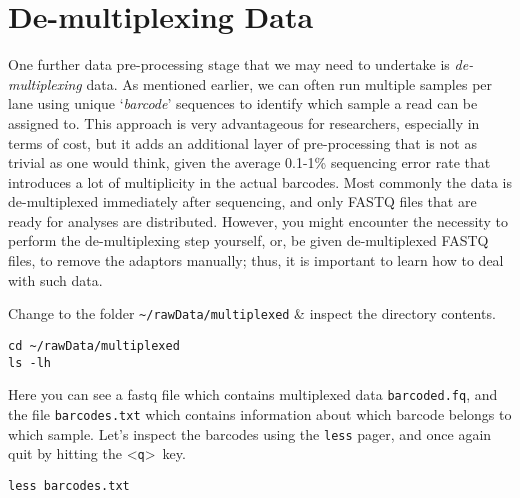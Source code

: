 



\section{De-multiplexing Data}

\begin{note}
One further data pre-processing stage that we may need to undertake is \textit{de-multiplexing} data.
As mentioned earlier, we can often run multiple samples per lane using unique `\textit{barcode}' sequences to identify which sample a read can be assigned to.
This approach is very advantageous for researchers, especially in terms of cost, but it adds an additional layer of pre-processing that is not as trivial as one would think, given the average 0.1-1\% sequencing error rate that introduces a lot of multiplicity in the actual barcodes. 
Most commonly the data is de-multiplexed immediately after sequencing, and only FASTQ files that are ready for analyses are distributed. 
However, you might encounter the necessity to perform the de-multiplexing step yourself, or, be given de-multiplexed FASTQ files, to remove the adaptors manually; thus, it is important to learn how to deal with such data. \\
\end{note}

\begin{steps}
Change to the folder \texttt{\~{}/rawData/multiplexed} \& inspect the directory contents.
\begin{lstlisting}
cd ~/rawData/multiplexed
ls -lh
\end{lstlisting}
Here you can see a fastq file which contains multiplexed data \texttt{barcoded.fq}, and the file \texttt{barcodes.txt} which contains information about which barcode belongs to which sample.
Let's inspect the barcodes using the \texttt{less} pager, and once again quit by hitting the \textless \texttt{q}\textgreater ~key.
\begin{lstlisting}
less barcodes.txt
\end{lstlisting}
\end{steps}

